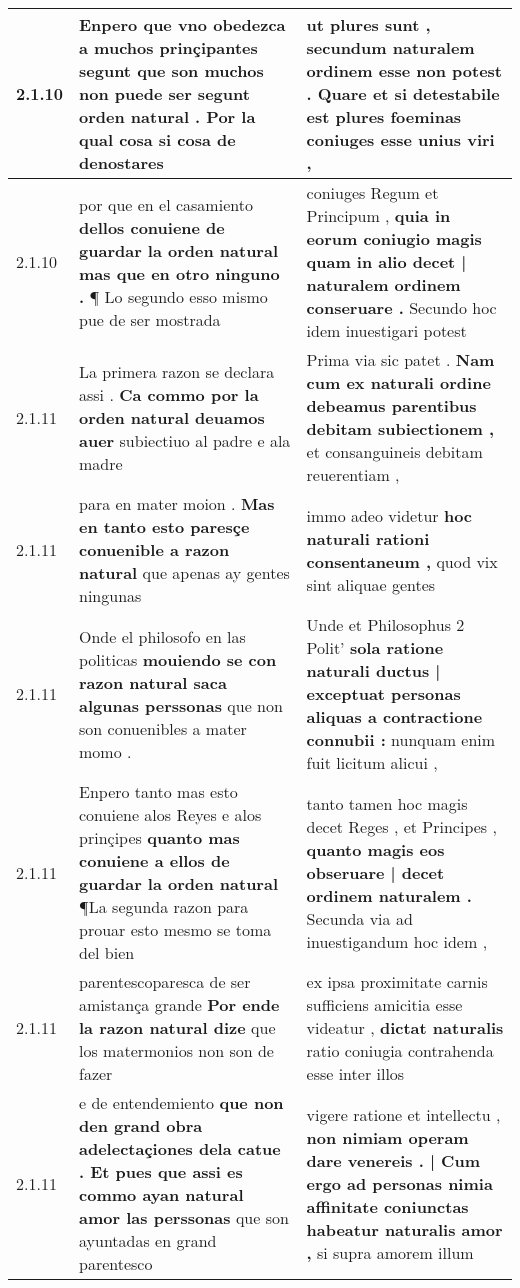 \begin{tabular}{|p{1cm}|p{6.5cm}|p{6.5cm}|}
2.1.10 & Enpero que vno obedezca a muchos prinçipantes \textbf{ segunt que son muchos non puede ser segunt orden natural . } Por la qual cosa si cosa de denostares & ut plures sunt , \textbf{ secundum naturalem ordinem esse non potest . Quare et si detestabile est } plures foeminas coniuges esse unius viri , \\\hline
2.1.10 & por que en el casamiento \textbf{ dellos conuiene de guardar la orden natural mas que en otro ninguno . } ¶ Lo segundo esso mismo pue de ser mostrada & coniuges Regum et Principum , \textbf{ quia in eorum coniugio magis quam in alio decet | naturalem ordinem conseruare . } Secundo hoc idem inuestigari potest \\\hline
2.1.11 & La primera razon se declara assi . \textbf{ Ca commo por la orden natural deuamos auer } subiectiuo al padre e ala madre & Prima via sic patet . \textbf{ Nam cum ex naturali ordine debeamus parentibus debitam subiectionem , } et consanguineis debitam reuerentiam , \\\hline
2.1.11 & para en mater moion . \textbf{ Mas en tanto esto paresçe conuenible a razon natural } que apenas ay gentes ningunas & immo adeo videtur \textbf{ hoc naturali rationi consentaneum , } quod vix sint aliquae gentes \\\hline
2.1.11 & Onde el philosofo en las politicas \textbf{ mouiendo se con razon natural saca algunas perssonas } que non son conuenibles a mater momo . & Unde et Philosophus 2 Polit’ \textbf{ sola ratione naturali ductus | exceptuat personas aliquas a contractione connubii : } nunquam enim fuit licitum alicui , \\\hline
2.1.11 & Enpero tanto mas esto conuiene alos Reyes e alos prinçipes \textbf{ quanto mas conuiene a ellos de guardar la orden natural } ¶La segunda razon para prouar esto mesmo se toma del bien & tanto tamen hoc magis decet Reges , et Principes , \textbf{ quanto magis eos obseruare | decet ordinem naturalem . } Secunda via ad inuestigandum hoc idem , \\\hline
2.1.11 & parentescoparesca de ser amistança grande \textbf{ Por ende la razon natural dize } que los matermonios non son de fazer & ex ipsa proximitate carnis sufficiens amicitia esse videatur , \textbf{ dictat naturalis } ratio coniugia contrahenda esse inter illos \\\hline
2.1.11 & e de entendemiento \textbf{ que non den grand obra adelectaçiones dela catue . Et pues que assi es commo ayan natural amor las perssonas } que son ayuntadas en grand parentesco & vigere ratione et intellectu , \textbf{ non nimiam operam dare venereis . | Cum ergo ad personas nimia affinitate coniunctas habeatur naturalis amor , } si supra amorem illum \\\hline

\end{tabular}
